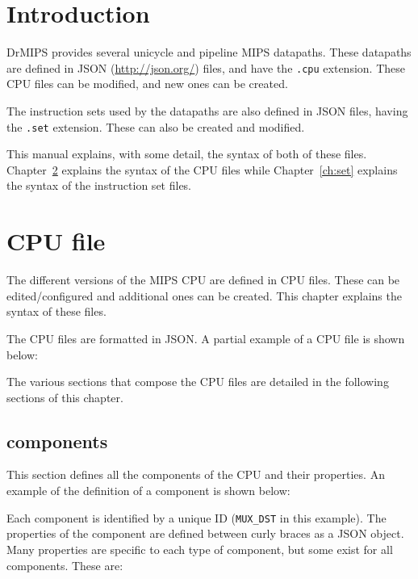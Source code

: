 \documentclass[11pt,a4paper,twoside,titlepage]{report}
\author{Bruno Nova}
\title{\Title}
\begin{document}
\maketitle
\tableofcontents


\chapter{Introduction}

DrMIPS provides several unicycle and pipeline MIPS datapaths.
These datapaths are defined in JSON (\url{http://json.org/}) files, and
have the \verb+.cpu+ extension.
These CPU files can be modified, and new ones can be created.

The instruction sets used by the datapaths are also defined in JSON files,
having the \verb+.set+ extension.
These can also be created and modified.

This manual explains, with some detail, the syntax of both of these files.
Chapter~\ref{ch:cpu} explains the syntax of the CPU files while
Chapter~\ref{ch:set} explains the syntax of the instruction set files.


\chapter{CPU file} \label{ch:cpu}

The different versions of the MIPS CPU are defined in CPU files.
These can be edited/configured and additional ones can be created.
This chapter explains the syntax of these files.

The CPU files are formatted in JSON.
A partial example of a CPU file is shown below:



The various sections that compose the CPU files are detailed in the
following sections of this chapter.


\section{components}

This section defines all the components of the CPU and their properties.
An example of the definition of a component is shown below:



Each component is identified by a unique ID (\verb+MUX_DST+ in this example).
The properties of the component are defined between curly braces as a JSON
object. Many properties are specific to each type of component, but some exist
for all components. These are:
\end{document}
